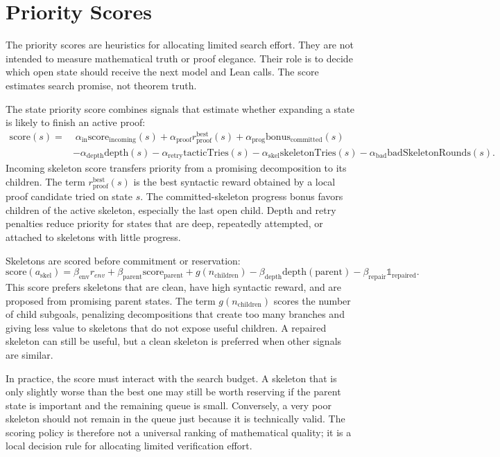 \documentclass[en]{uet_awesome_thesis/uet-awesome-thesis}
\begin{document}
\section{Priority Scores}

The priority scores are heuristics for allocating limited search effort. They are not intended to measure mathematical truth or proof elegance. Their role is to decide which open state should receive the next model and Lean calls. The score estimates search promise, not theorem truth.

The state priority score combines signals that estimate whether expanding a state is likely to finish an active proof:
\[
\begin{aligned}
\mathrm{score}(s) =
&\; \alpha_{\mathrm{in}} \mathrm{score}_{\mathrm{incoming}}(s)
+ \alpha_{\mathrm{proof}} r_{\mathrm{proof}}^{\mathrm{best}}(s)
+ \alpha_{\mathrm{prog}} \mathrm{bonus}_{\mathrm{committed}}(s) \\
&- \alpha_{\mathrm{depth}} \mathrm{depth}(s)
- \alpha_{\mathrm{retry}} \mathrm{tacticTries}(s)
- \alpha_{\mathrm{skel}} \mathrm{skeletonTries}(s)
- \alpha_{\mathrm{bad}} \mathrm{badSkeletonRounds}(s).
\end{aligned}
\]
Incoming skeleton score transfers priority from a promising decomposition to its children. The term \(r_{\mathrm{proof}}^{\mathrm{best}}(s)\) is the best syntactic reward obtained by a local proof candidate tried on state \(s\). The committed-skeleton progress bonus favors children of the active skeleton, especially the last open child. Depth and retry penalties reduce priority for states that are deep, repeatedly attempted, or attached to skeletons with little progress.

Skeletons are scored before commitment or reservation:
\[
\mathrm{score}(a_{\mathrm{skel}}) =
\beta_{\mathrm{env}} r_{env}
+ \beta_{\mathrm{parent}} \mathrm{score}_{\mathrm{parent}}
+ g(n_{\mathrm{children}})
- \beta_{\mathrm{depth}} \mathrm{depth(parent)}
- \beta_{\mathrm{repair}} \mathds{1}_{\mathrm{repaired}}.
\]
This score prefers skeletons that are clean, have high syntactic reward, and are proposed from promising parent states. The term \(g(n_{\mathrm{children}})\) scores the number of child subgoals, penalizing decompositions that create too many branches and giving less value to skeletons that do not expose useful children. A repaired skeleton can still be useful, but a clean skeleton is preferred when other signals are similar.

In practice, the score must interact with the search budget. A skeleton that is only slightly worse than
the best one may still be worth reserving if the parent state is important and the remaining queue is small.
Conversely, a very poor skeleton should not remain in the queue just because it is technically valid. The
scoring policy is therefore not a universal ranking of mathematical quality; it is a local decision rule for
allocating limited verification effort.
\end{document}
